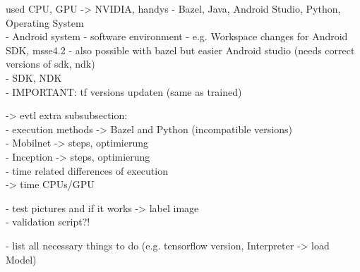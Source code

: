 		used CPU, GPU -> NVIDIA, handys
	- Bazel, Java, Android Studio, Python, Operating System \\
 	- Android system
 		- software environment
				- e.g. Workspace changes for Android SDK, msse4.2
				- also possible with bazel but easier Android studio (needs correct versions of sdk, ndk) \\
				- SDK, NDK \\
				- IMPORTANT: tf versions updaten (same as trained)

	-> evtl extra subsubsection: \\
		- execution methods -> Bazel and Python (incompatible versions) \\
		- Mobilnet -> steps, optimierung \\
		- Inception -> steps, optimierung \\
		- time related differences of execution  \\
		  -> time CPUs/GPU

	 	- test pictures and if it works -> label image \\
	 	- validation script?!

		- list all necessary things to do (e.g. tensorflow version, Interpreter -> load Model)

